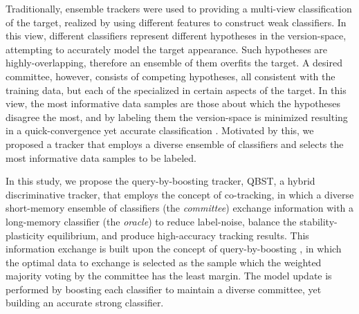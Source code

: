 \documentclass[10pt, conference, compsocconf]{IEEEtran}
\begin{document}
Traditionally, ensemble trackers were used to providing a multi-view classification of the target, realized by using different features to construct weak classifiers. In this view, different classifiers represent different hypotheses in the version-space, attempting to accurately model the target appearance. Such hypotheses are highly-overlapping, therefore an ensemble of them overfits the target. A desired committee, however, consists of competing hypotheses, all consistent with the training data, but each of the specialized in certain aspects of the target. In this view, the most informative data samples are those about which the hypotheses disagree the most, and by labeling them the version-space is minimized resulting in a quick-convergence yet accurate classification \cite{seung1992query}.  Motivated by this, we proposed a tracker that employs a diverse ensemble of classifiers and selects the most informative data samples to be labeled.

In this study, we propose the query-by-boosting tracker, QBST, a hybrid discriminative tracker, that employs the concept of co-tracking, in which a diverse short-memory ensemble of classifiers (the \textit{committee}) exchange information with a long-memory classifier (the \textit{oracle}) to reduce label-noise, balance the stability-plasticity equilibrium, and produce high-accuracy tracking results. This information exchange is built upon the concept of query-by-boosting \cite{abe1998query}, in which the optimal data to exchange is selected as the sample which the weighted majority voting by the committee has the least margin. The model update is performed by boosting each classifier to maintain a diverse committee, yet building an accurate strong classifier.
\end{document}
